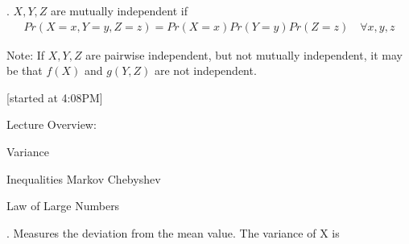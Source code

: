 \documentclass[12pt]{article}
\newcommand{\myspace}{\vspace{2\bigskipamount}}
\newcommand\p{\Needspace{12\baselineskip} \noindent}
\begin{document}
\myspace 
\p {}. $X, Y, Z$ are mutually independent if 
\begin{align}
	Pr\left( X=x, Y=y, Z=z\right) = Pr(X=x)Pr(Y=y)Pr(Z=z) \quad \forall x, y, z
\end{align}

\begin{compactitem}[$\rightarrow$]
	\item Note: If $X, Y, Z$ are pairwise independent, but not mutually independent, it may be that $f(X)$ and $g(Y, Z)$ are not independent.
\end{compactitem}



[started at 4:08PM]

\p Lecture Overview:
\begin{compactitem}[$\rightarrow$]
	\item Variance
	\item Inequalities
	\subitem Markov
	\subitem Chebyshev
	\item Law of Large Numbers
\end{compactitem}

\myspace
\p {}. Measures the deviation from the mean value. The variance of X is 
\end{document}
